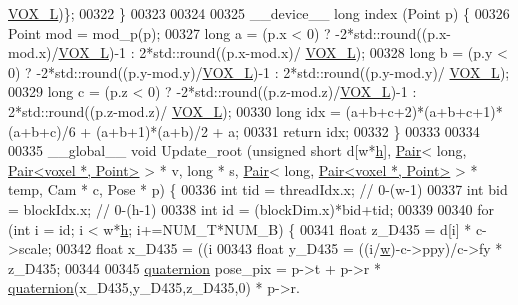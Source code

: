 \begin{DoxyCode}
{      \hyperlink{Voxel_8hpp_a3c1c8b966e30fa8ca2de07abe3b3d74a}{VOX\_L})\};
00322 \}
00323 
00324 
00325 \_\_device\_\_ \textcolor{keywordtype}{long} index (Point p) \{
00326     Point mod = mod\_p(p);
00327     \textcolor{keywordtype}{long} a = (p.x < 0) ? -2*std::round((p.x-mod.x)/\hyperlink{Voxel_8hpp_a3c1c8b966e30fa8ca2de07abe3b3d74a}{VOX\_L})-1 : 2*std::round((p.x-mod.x)/
      \hyperlink{Voxel_8hpp_a3c1c8b966e30fa8ca2de07abe3b3d74a}{VOX\_L});
00328     \textcolor{keywordtype}{long} b = (p.y < 0) ? -2*std::round((p.y-mod.y)/\hyperlink{Voxel_8hpp_a3c1c8b966e30fa8ca2de07abe3b3d74a}{VOX\_L})-1 : 2*std::round((p.y-mod.y)/
      \hyperlink{Voxel_8hpp_a3c1c8b966e30fa8ca2de07abe3b3d74a}{VOX\_L});
00329     \textcolor{keywordtype}{long} c = (p.z < 0) ? -2*std::round((p.z-mod.z)/\hyperlink{Voxel_8hpp_a3c1c8b966e30fa8ca2de07abe3b3d74a}{VOX\_L})-1 : 2*std::round((p.z-mod.z)/
      \hyperlink{Voxel_8hpp_a3c1c8b966e30fa8ca2de07abe3b3d74a}{VOX\_L});
00330     \textcolor{keywordtype}{long} idx = (a+b+c+2)*(a+b+c+1)*(a+b+c)/6 + (a+b+1)*(a+b)/2 + a;
00331     \textcolor{keywordflow}{return} idx;
00332 \}
00333 
00334 
00335 \_\_global\_\_ \textcolor{keywordtype}{void} Update\_root (\textcolor{keywordtype}{unsigned} \textcolor{keywordtype}{short} d[w*\hyperlink{Camera_8hpp_a3f40fea9b1040e381f08ddd4b026765d}{h}], \hyperlink{classPair}{Pair}< \textcolor{keywordtype}{long}, 
      \hyperlink{classPair}{Pair<voxel *, Point>} > * v, \textcolor{keywordtype}{long} * s, \hyperlink{classPair}{Pair}< \textcolor{keywordtype}{long}, 
      \hyperlink{classPair}{Pair<voxel *, Point>} > * temp, Cam * c, Pose * p) \{
00336     \textcolor{keywordtype}{int} tid = threadIdx.x; \textcolor{comment}{// 0-(w-1)}
00337     \textcolor{keywordtype}{int} bid = blockIdx.x; \textcolor{comment}{// 0-(h-1)}
00338     \textcolor{keywordtype}{int} \textcolor{keywordtype}{id}  = (blockDim.x)*bid+tid;
00339 
00340     \textcolor{keywordflow}{for} (\textcolor{keywordtype}{int} i = \textcolor{keywordtype}{id}; i < w*\hyperlink{Camera_8hpp_a3f40fea9b1040e381f08ddd4b026765d}{h}; i+=NUM\_T*NUM\_B) \{
00341         \textcolor{keywordtype}{float} z\_D435 = d[i] * c->scale;
00342         \textcolor{keywordtype}{float} x\_D435 = ((i%
00343         \textcolor{keywordtype}{float} y\_D435 = ((i/\hyperlink{classquaternion_ab2b38aca1971114e0ba4218b75d7f472}{w})-c->ppy)/c->fy * z\_D435;
00344 
00345         \hyperlink{classquaternion}{quaternion} pose\_pix = p->t + p->r * \hyperlink{classquaternion_a7939abaec2de1b11ff2208cbd8fbd93e}{quaternion}(x\_D435,y\_D435,z\_D435,0) * p->r.
}
\end{DoxyCode}
